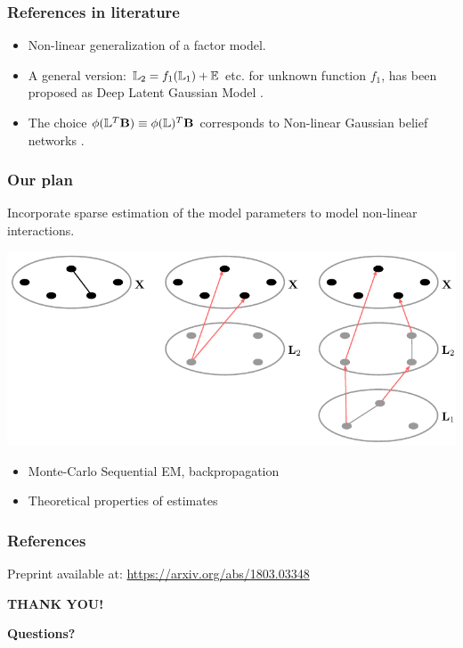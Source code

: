 \documentclass[10pt]{beamer}
\theoremstyle{definition}
\newcommand{\colubf}{\color{UniBlue}\bf}
\begin{document}
\begin{frame}
\frametitle{References in literature}

\begin{itemize}
\item Non-linear generalization of a factor model.

\vspace{1em}
\item A general version: ${\mathbb{L}}_2 = f_1({\mathbb{L}}_1) + {\mathbb{E}}$ etc. for unknown function $f_1$, has been proposed as Deep Latent Gaussian Model \citep{RezendeEtal14}.

\vspace{1em}
\item The choice $\phi({\mathbb{L}}^T {\mathbf{B}}) \equiv \phi({\mathbb{L}})^T {\mathbf{B}}$ corresponds to Non-linear Gaussian belief networks \citep{FreyHinton99}.

\end{itemize}
\end{frame}

\begin{frame}
\frametitle{Our plan}

Incorporate sparse estimation of the model parameters to model non-linear interactions.

\begin{center}
\includegraphics[width=.7\textwidth]{../MS/latentinteractions}
\end{center}

\begin{itemize}
\item Monte-Carlo Sequential EM, backpropagation
\item Theoretical properties of estimates
\end{itemize}

\end{frame}

\begin{frame}
\frametitle{References}
Preprint available at: \url{https://arxiv.org/abs/1803.03348}

\vspace{1em}
{\scriptsize


}
\end{frame}


\begin{frame}
\centering
{\huge\textcolor{UniBlue}{\textbf{THANK YOU!}}}\\

\vspace{2em}

{\colubf Questions?}
\end{frame}
\end{document}
